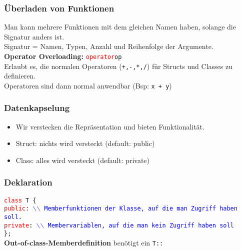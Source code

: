 \documentclass[a3paper, 10pt, landscape]{scrartcl}
\newcommand{\code}[1]{\texttt{#1}}
\begin{document}
\begin{multicols*}{3}
	\subsubsection{Überladen von Funktionen}
	Man kann mehrere Funktionen mit dem gleichen Namen haben, solange die Signatur anders ist. \\
	Signatur = Namen, Typen, Anzahl und Reihenfolge der Argumente. \\
	\newline
	\textbf{Operator Overloading:} \code{\textcolor{red}{operator}op} \\
	Erlaubt es, die normalen Operatoren (\code{+,-,*,/}) für Structs und Classes zu definieren. \\
	Operatoren sind dann normal anwendbar (Bsp: \code{x + y})
	
	\subsubsection{Datenkapselung}
	\begin{itemize}
		\item Wir verstecken die Repräsentation und bieten Funktionalität.
		\item Struct: nichts wird versteckt (default: public)
		\item Class: alles wird versteckt (default: private)
	\end{itemize}
	
	\subsubsection{Deklaration}
	\code{\textcolor{red}{class} T \{ \\
	\textcolor{red}{public}: \textcolor{blue}{$\backslash$$\backslash$ Memberfunktionen der Klasse, auf die man Zugriff haben soll.} \\
	\textcolor{red}{private}: \textcolor{blue}{$\backslash$$\backslash$ Membervariablen, auf die man kein Zugriff haben soll} \\
	\}; \\}
	\newline
	\textbf{Out-of-class-Memberdefinition} benötigt ein \code{T::}
	

\end{multicols*}
\end{document}

